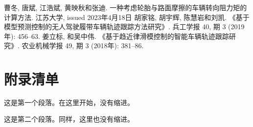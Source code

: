 \documentclass[withoutpreface,bwprint]{cumcmthesis} %
\begin{document}
\renewcommand{\refname}{十一、参考文献} %
\begin{thebibliography}{9}%
  曹冬, 唐斌, 江浩斌, 黄映秋和张迪. 一种考虑轮胎与路面摩擦的车辆转向阻力矩的计算方法. 江苏大学, issued 2023年4月18日
  胡家铭, 胡宇辉, 陈慧岩和刘凯. 《基于模型预测控制的无人驾驶履带车辆轨迹跟踪方法研究》. 兵工学报 40, 期 3 (2019年): 456–63. 
  姜立标, 和吴中伟. 《基于趋近律滑模控制的智能车辆轨迹跟踪研究》. 农业机械学报 49, 期 3 (2018年): 381–86.
\end{thebibliography}

\newpage
\section*{附录清单}


这是第一个段落。在这里开始，没有缩进。

这是第二个段落。同样，这里也没有缩进。


\newpage
\end{document}

